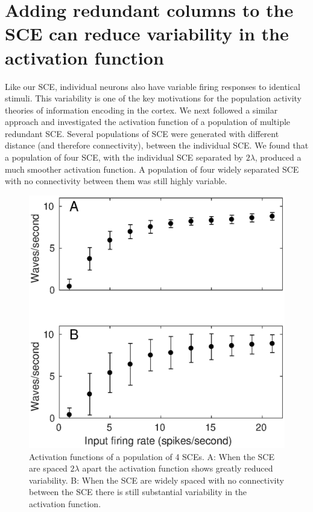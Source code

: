\FloatBarrier

\section{Adding redundant columns to the SCE can reduce variability in the activation function}
Like our SCE, individual neurons also have variable firing responses to identical stimuli.
This variability is one of the key motivations for the population activity theories of information encoding in the cortex.
We next followed a similar approach and investigated the activation function of a population of multiple redundant SCE.
Several populations of SCE were generated with different distance (and therefore connectivity), between the individual SCE.
We found that a population of four SCE, with the individual SCE separated by $2\lambda$, produced a much smoother activation function.
A population of four widely separated SCE with no connectivity between them was still highly variable.


\begin{figure}[!htb]
 \centering
 \includegraphics[width=\textwidth]{fig/OneLambdaFourLambda}
 \caption{Activation functions of a population of 4 SCEs. 
	    A: When the SCE are spaced $2\lambda$ apart the activation function shows greatly reduced variability. 
	    B: When the SCE are widely spaced with no connectivity between the SCE there is still substantial variability in the activation function.}
 \label{fig:sce_4x4_coupled_activation_function}
\end{figure}

\FloatBarrier


\endinput
